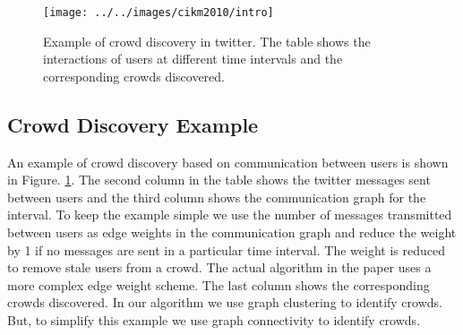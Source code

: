 \documentclass{sig-alternate}
\begin{document}


\begin{figure}[!t]
\begin{center}
\texttt{[image: ../../images/cikm2010/intro]}
\caption{Example of crowd discovery in twitter. The table shows the
interactions of users at different time intervals and the corresponding crowds
discovered.}
\label{fig:intro-example}
\end{center}
\end{figure}

\subsection{Crowd Discovery Example}
An example of crowd discovery based on communication between users is shown in
Figure. \ref{fig:intro-example}. The second column in the table shows the
twitter messages sent between users and the third column shows the communication
graph for the interval. To keep the example simple we use the number of
messages transmitted between users as edge weights in the communication
graph and reduce the weight by 1 if no messages are sent in a particular time
interval. The weight is reduced to remove stale users from a crowd. The actual
algorithm in the paper uses a more complex edge weight scheme. The last
column shows the corresponding crowds discovered. In our algorithm we use
graph clustering to identify crowds. But, to simplify this example we use graph
connectivity to identify crowds.
\end{document}
